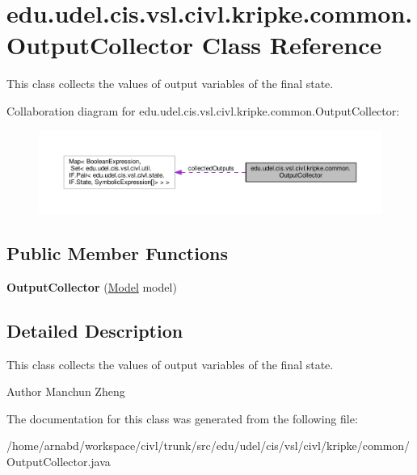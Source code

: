 \hypertarget{classedu_1_1udel_1_1cis_1_1vsl_1_1civl_1_1kripke_1_1common_1_1OutputCollector}{}\section{edu.\+udel.\+cis.\+vsl.\+civl.\+kripke.\+common.\+Output\+Collector Class Reference}
\label{classedu_1_1udel_1_1cis_1_1vsl_1_1civl_1_1kripke_1_1common_1_1OutputCollector}


This class collects the values of output variables of the final state.  




Collaboration diagram for edu.\+udel.\+cis.\+vsl.\+civl.\+kripke.\+common.\+Output\+Collector\+:
\nopagebreak
\begin{figure}[H]
\begin{center}
\leavevmode
\includegraphics[width=350pt]{classedu_1_1udel_1_1cis_1_1vsl_1_1civl_1_1kripke_1_1common_1_1OutputCollector__coll__graph}
\end{center}
\end{figure}
\subsection*{Public Member Functions}
\begin{DoxyCompactItemize}
\item 
\hypertarget{classedu_1_1udel_1_1cis_1_1vsl_1_1civl_1_1kripke_1_1common_1_1OutputCollector_a04d91117e2d0af8a2dc4e451491c45af}{}{\bfseries Output\+Collector} (\hyperlink{interfaceedu_1_1udel_1_1cis_1_1vsl_1_1civl_1_1model_1_1IF_1_1Model}{Model} model)\label{classedu_1_1udel_1_1cis_1_1vsl_1_1civl_1_1kripke_1_1common_1_1OutputCollector_a04d91117e2d0af8a2dc4e451491c45af}

\end{DoxyCompactItemize}


\subsection{Detailed Description}
This class collects the values of output variables of the final state. 

\begin{DoxyAuthor}{Author}
Manchun Zheng 
\end{DoxyAuthor}


The documentation for this class was generated from the following file\+:\begin{DoxyCompactItemize}
\item 
/home/arnabd/workspace/civl/trunk/src/edu/udel/cis/vsl/civl/kripke/common/Output\+Collector.\+java\end{DoxyCompactItemize}
